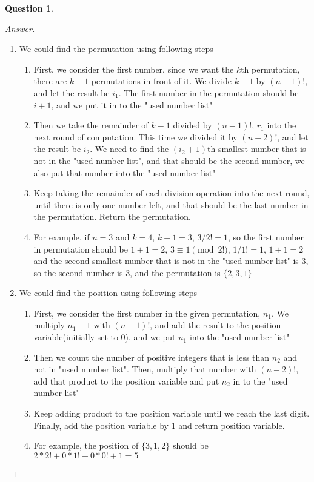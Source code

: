 \documentclass{article}
\theoremstyle{plain}
\newtheorem{question}{Question}
\newenvironment{answer}[1][Answer]
    {\begin{proof}[#1]{$ $}\renewcommand\qedsymbol{$\vartriangle$}}
    {\end{proof}}
\begin{document}
\begin{question}
\end{question}
\begin{answer}
    \begin{enumerate}
        \item We could find the permutation using following steps
            \begin{enumerate}
                \item First, we consider the first number, since we want the $k$th permutation, there are $k - 1$ permutations in front of it. We divide $k - 1$ by $(n-1)!$, and let the result be $i_1$. The first number in the permutation should be $i + 1$, and we put it in to the "used number list"
                \item Then we take the remainder of $k - 1$ divided by $(n-1)!$, $r_1$ into the next round of computation. This time we divided it by $(n-2)!$, and let the result be $i_2$. We need to find the $(i_2 + 1)$th smallest number that is not in the "used number list", and that should be the second number, we also put that number into the "used number list"
                \item Keep taking the remainder of each division operation into the next round, until there is only one number left, and that should be the last number in the permutation. Return the permutation.
                \item For example, if $n = 3$ and $k = 4$, $k - 1 = 3$, $3 / 2! = 1$, so the first number in permutation should be $1 + 1 = 2$, $3 \equiv 1 \pmod{2!}$, $1 / 1! = 1$, $1 + 1 =2 $ and the second smallest number that is not in the "used number list" is $3$, so the second number is $3$, and the permutation is $\{ 2,3,1\}$
            \end{enumerate}
        \item We could find the position using following steps
            \begin{enumerate}
                \item First, we consider the first number in the given permutation, $n_1$. We multiply $n_1 - 1$ with $(n-1)!$, and add the result to the position variable(initially set to 0), and we put $n_1$ into the "used number list"
                \item Then we count the number of positive integers that is less than $n_2$ and not in "used number list". Then, multiply that number with $(n-2)!$, add that product to the position variable and put $n_2$ in to the "used number list"
                \item Keep adding product to the position variable until we reach the last digit. Finally, add the position variable by 1 and return position variable.
                \item
                For example, the position of $\{ 3,1,2 \}$ should be $2*2! + 0*1! + 0*0! + 1 = 5$
            \end{enumerate}
    \end{enumerate}
\end{answer}
\end{document}
